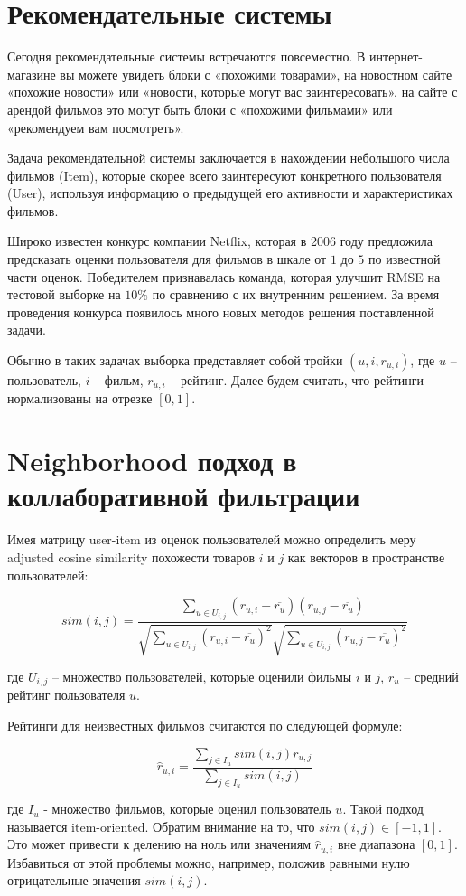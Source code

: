 \documentclass[11pt, fleqn]{article}
\begin{document}
\newpage
\section{Рекомендательные системы}
Сегодня рекомендательные системы встречаются повсеместно. В интернет-магазине вы можете увидеть блоки с «похожими товарами», на новостном сайте «похожие новости» или «новости, которые могут вас заинтересовать», на сайте с арендой фильмов это могут быть блоки с «похожими фильмами» или «рекомендуем вам посмотреть».

Задача рекомендательной системы заключается в нахождении небольшого числа фильмов (Item), которые
скорее всего заинтересуют конкретного пользователя (User), используя информацию о предыдущей его активности и характеристиках фильмов.

Широко известен конкурс компании Netflix, которая в 2006 году предложила предсказать оценки пользователя для фильмов в шкале от $1$ до $5$ по известной части оценок. Победителем признавалась команда, которая улучшит RMSE на тестовой выборке на $10\%$ по сравнению с их внутренним решением. За время проведения конкурса появилось много новых методов решения поставленной задачи.

Обычно в таких задачах выборка представляет собой тройки $(u, i, r_{u,i})$, где $u$ – пользователь, $i$ – фильм, $r_{u,i}$ – рейтинг. Далее будем считать, что рейтинги нормализованы на отрезке $[0, 1]$.

\section{Neighborhood подход в коллаборативной фильтрации}
Имея матрицу user-item из оценок пользователей можно определить меру adjusted cosine similarity похожести товаров $i$ и $j$ как векторов в пространстве пользователей:
\begin{ceqn}
\begin{equation} \label{eq:1}
sim(i, j) = \frac{\sum\limits_{u \in U_{i,j}}(r_{u, i} - \overline{r_{u}})(r_{u,j} - \overline{r_{u}})}{\sqrt{\sum\limits_{u \in U_{i,j}}(r_{u, i} - \overline{r_{u}})^{2}}\sqrt{\sum\limits_{u \in U_{i,j}}(r_{u, j} - \overline{r_{u}})^{2}}}
\end{equation}
\end{ceqn}
где $U_{i,j}$ – множество пользователей, которые оценили фильмы $i$ и $j$, $\overline{r_{u}}$ – средний рейтинг пользователя $u$.

Рейтинги для неизвестных фильмов считаются по следующей формуле:
\begin{ceqn}
\begin{equation} \label{eq:2}
\hat{r}_{u,i}=\frac{\sum\limits_{j \in I_{u}}sim(i,j)r_{u,j}}{\sum\limits_{j \in I_{u}}sim(i,j)}
\end{equation}
\end{ceqn}
где $I_{u}$ - множество фильмов, которые оценил пользователь $u$. Такой подход называется item-oriented. Обратим внимание на то, что $sim(i, j) \in [-1, 1]$. Это может привести к делению на ноль или значениям $\hat{r}_{u,i}$ вне диапазона $[0, 1]$. Избавиться от этой проблемы можно, например, положив равными нулю отрицательные значения $sim(i, j)$.
\end{document}
